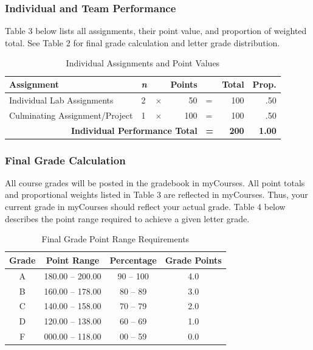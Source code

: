 \documentclass[
]{article}
\begin{document}
\subsubsection{Individual and Team Performance}

Table 3 below lists all assignments, their point value, and proportion
of weighted total. See Table 2 for final grade calculation and letter
grade distribution.

\begin{table}[H]
\centering
\caption{Individual Assignments and Point Values}
\vspace{3mm}
\label{points}
\begin{tabular}{lllrlrr}
\hline
\bf{Assignment} & \bf{\em{n}} &  & \bf{Points} &  & \bf{Total} & \bf{Prop.} \\
\hline
Individual Lab Assignments & 2 & $\times$ & 50 & = & 100 & .50 \\
Culminating Assignment/Project & 1 & $\times$ & 100 & = & 100 & .50 \\
\multicolumn{4}{r}{\bf{Individual Performance Total}} & {\bf{=}} & {\bf{200}} & {\bf{1.00}} \\
\hline
\end{tabular}
\label{points}
\end{table}

\subsubsection{Final Grade Calculation}

All course grades will be posted in the gradebook in myCourses. All
point totals and proportional weights listed in Table 3 are reflected in
myCourses. Thus, your current grade in myCourses should reflect your
actual grade. Table 4 below describes the point range required to
achieve a given letter grade.

\begin{table}[H]
\begin{center}
\caption{Final Grade Point Range Requirements}
\label{finalgrades}
\vspace{3mm}
\begin{tabular}{cccc}
\hline
\bf{Grade} & \bf{Point Range} & \bf{Percentage} & \bf{Grade Points}\\
\hline
A & 180.00 -- 200.00 & 90 -- 100 & 4.0\\ 
B & 160.00 -- 178.00 & 80 -- 89  & 3.0\\ 
C & 140.00 -- 158.00 & 70 -- 79  & 2.0\\ 
D & 120.00 -- 138.00 & 60 -- 69  & 1.0\\ 
F & 000.00 -- 118.00 & 00 -- 59  & 0.0\\
\hline
\end{tabular}
\end{center}
\end{table}
\end{document}
